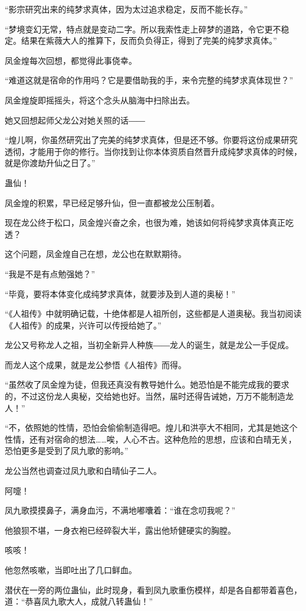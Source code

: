 \begin{this_body}
“影宗研究出来的纯梦求真体，因为太过追求稳定，反而不能长存。”

“梦境变幻无常，特点就是变动二字。所以我索性走上碎梦的道路，令它更不稳定。结果在紫薇大人的推算下，反而负负得正，得到了完美的纯梦求真体。”

凤金煌每次回想，都觉得此事侥幸。

“难道这就是宿命的作用吗？它是要借助我的手，来令完整的纯梦求真体现世？”

凤金煌旋即摇摇头，将这个念头从脑海中扫除出去。

她又回想起师父龙公对她关照的话――

“煌儿啊，你虽然研究出了完美的纯梦求真体，但是还不够。你要将这份成果研究透彻，才能用于你的修行。当你找到让你本体资质自然晋升成纯梦求真体的时候，就是你渡劫升仙之日了。”

蛊仙！

凤金煌的积累，早已经足够升仙，但一直都被龙公压制着。

现在龙公终于松口，凤金煌兴奋之余，也很为难，她该如何将纯梦求真体真正吃透？

这个问题，凤金煌自己在想，龙公也在默默期待。

“我是不是有点勉强她？”

“毕竟，要将本体变化成纯梦求真体，就要涉及到人道的奥秘！”

“《人祖传》中就明确记载，十绝体都是人祖所创，这些都是人道奥秘。我当初阅读《人祖传》的成果，兴许可以传授给她了。”

龙公又号称龙人之祖，当初全新异人种族――龙人的诞生，就是龙公一手促成。

而龙人这个成果，就是龙公参悟《人祖传》而得。

“虽然收了凤金煌为徒，但我还真没有教导她什么。她恐怕是不能完成我的要求的，不过这份龙人奥秘，交给她也好。当然，届时还得告诫她，万万不能制造龙人！”

“不，依照她的性情，恐怕会偷偷制造得吧。煌儿和洪亭大不相同，尤其是她这个性情，还有对宿命的想法……唉，人心不古。这种危险的思想，应该和白晴无关，恐怕更多是受到了凤九歌的影响。”

龙公当然也调查过凤九歌和白晴仙子二人。

阿嚏！

凤九歌摸摸鼻子，满身血污，不满地嘟囔着：“谁在念叨我呢？”

他狼狈不堪，一身衣袍已经碎裂大半，露出他矫健硬实的胸膛。

咳咳！

他忽然咳嗽，当即吐出了几口鲜血。

潜伏在一旁的两位蛊仙，此时现身，看到凤九歌重伤模样，却是各自都带着喜色，道：“恭喜凤九歌大人，成就八转蛊仙！”


\end{this_body}
